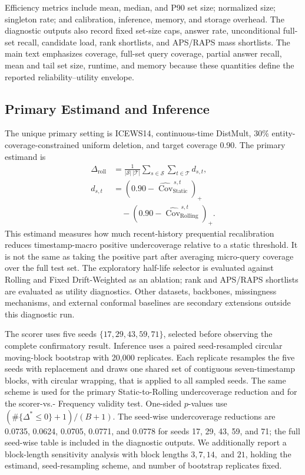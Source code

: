 \documentclass[10pt,twocolumn]{article}
\newcommand{\cov}{\operatorname{Cov}}
\begin{document}
Efficiency metrics include mean, median, and P90 set size; normalized size;
singleton rate; and calibration, inference, memory, and storage overhead.
The diagnostic outputs also record fixed set-size caps, answer rate,
unconditional full-set recall, candidate load, rank shortlists, and APS/RAPS
mass shortlists. The main text emphasizes coverage, full-set query coverage,
partial answer recall, mean and tail set size, runtime, and memory because
these quantities define the reported reliability--utility envelope.

\subsection{Primary Estimand and Inference}

The unique primary setting is ICEWS14, continuous-time DistMult, 30\%
entity-coverage-constrained uniform deletion, and target coverage 0.90. The
primary estimand is
\[
\begin{aligned}
  \Delta_{\mathrm{roll}}
  &=\frac{1}{|\mathcal{S}|\,|\mathcal{T}|}
    \sum_{s\in\mathcal{S}}\sum_{t\in\mathcal{T}} d_{s,t},\\
  d_{s,t}
  &=(0.90-\widehat{\cov}^{\,s,t}_{\mathrm{Static}})_+\\
  &\quad -(0.90-\widehat{\cov}^{\,s,t}_{\mathrm{Rolling}})_+ .
\end{aligned}
\]
This estimand measures how much recent-history prequential recalibration reduces
timestamp-macro positive undercoverage relative to a static threshold. It is not
the same as taking the positive part after averaging micro-query coverage over
the full test set. The exploratory half-life selector is evaluated against
Rolling and Fixed Drift-Weighted as an ablation; rank and APS/RAPS shortlists
are evaluated as utility diagnostics. Other datasets, backbones, missingness
mechanisms, and external conformal baselines are secondary extensions outside
this diagnostic run.

The scorer uses five seeds
\(\{17,29,43,59,71\}\), selected before observing the complete confirmatory
result. Inference uses a paired seed-resampled circular moving-block bootstrap
with 20,000 replicates. Each replicate resamples the five seeds with replacement
and draws one shared set of contiguous seven-timestamp blocks, with circular
wrapping, that is applied to all sampled seeds. The same scheme is used for the
primary Static-to-Rolling undercoverage reduction and for the scorer-vs.-
Frequency validity test. One-sided \(p\)-values use
\((\#\{\Delta^\ast\leq 0\}+1)/(B+1)\).
The seed-wise undercoverage reductions are 0.0735, 0.0624, 0.0705, 0.0771,
and 0.0778 for seeds 17, 29, 43, 59, and 71; the full seed-wise table is
included in the diagnostic outputs.
We additionally report a block-length sensitivity analysis with block lengths
\(3,7,14,\) and \(21\), holding the estimand, seed-resampling scheme, and
number of bootstrap replicates fixed.
\end{document}
